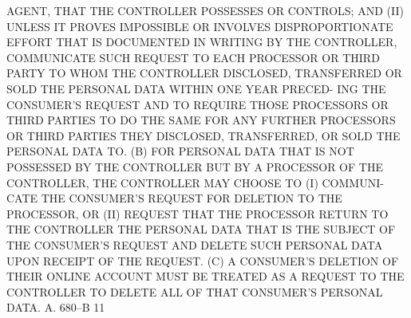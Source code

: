  AGENT,  THAT THE CONTROLLER POSSESSES OR CONTROLS; AND
   (II) UNLESS IT PROVES IMPOSSIBLE OR INVOLVES  DISPROPORTIONATE  EFFORT
 THAT  IS  DOCUMENTED  IN  WRITING  BY  THE  CONTROLLER, COMMUNICATE SUCH
 REQUEST TO  EACH  PROCESSOR  OR  THIRD  PARTY  TO  WHOM  THE  CONTROLLER
 DISCLOSED, TRANSFERRED OR SOLD THE PERSONAL DATA WITHIN ONE YEAR PRECED-
 ING  THE  CONSUMER'S  REQUEST  AND  TO REQUIRE THOSE PROCESSORS OR THIRD
 PARTIES TO DO THE SAME FOR ANY FURTHER PROCESSORS OR THIRD PARTIES  THEY
 DISCLOSED, TRANSFERRED, OR SOLD THE PERSONAL DATA TO.
   (B) FOR PERSONAL DATA THAT IS NOT POSSESSED BY THE CONTROLLER BUT BY A
 PROCESSOR  OF  THE CONTROLLER, THE CONTROLLER MAY CHOOSE TO (I) COMMUNI-
 CATE THE CONSUMER'S REQUEST FOR  DELETION  TO  THE  PROCESSOR,  OR  (II)
 REQUEST  THAT  THE  PROCESSOR RETURN TO THE CONTROLLER THE PERSONAL DATA
 THAT IS THE SUBJECT OF THE CONSUMER'S REQUEST AND DELETE  SUCH  PERSONAL
 DATA UPON RECEIPT OF THE REQUEST.
   (C) A CONSUMER'S DELETION OF THEIR ONLINE ACCOUNT MUST BE TREATED AS A
 REQUEST  TO  THE  CONTROLLER  TO  DELETE ALL OF THAT CONSUMER'S PERSONAL
 DATA.
 A. 680--B                          11
 
